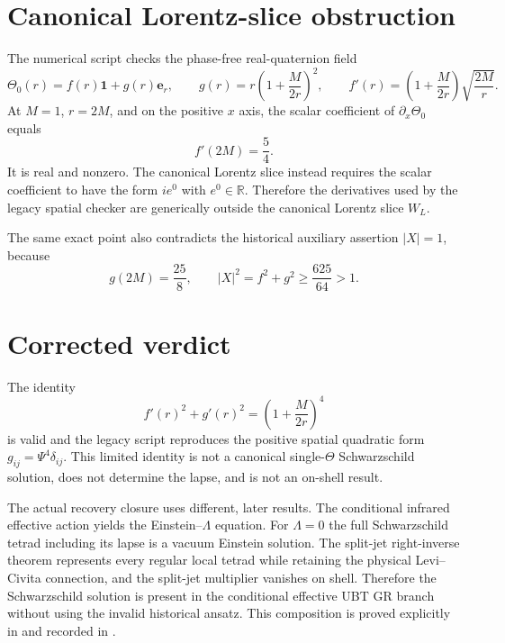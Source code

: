 \documentclass[11pt,a4paper]{article}
\begin{document}
\section{Canonical Lorentz-slice obstruction}
The numerical script checks the phase-free real-quaternion field
\begin{equation}
 \Theta_0(r)=f(r)\mathbf1+g(r)\mathbf e_r,
 \qquad
 g(r)=r\left(1+\frac{M}{2r}\right)^2,
 \qquad
 f'(r)=\left(1+\frac{M}{2r}\right)\sqrt{\frac{2M}{r}}.
 \label{eq:legacy-spatial}
\end{equation}
At $M=1$, $r=2M$, and on the positive $x$ axis, the scalar coefficient of
$\partial_x\Theta_0$ equals
\begin{equation}
 f'(2M)=\frac54.
 \label{eq:slice-witness}
\end{equation}
It is real and nonzero.  The canonical Lorentz slice instead requires the
scalar coefficient to have the form $i e^0$ with $e^0\in\mathbb R$.
Therefore the derivatives used by the legacy spatial checker are generically
outside the canonical Lorentz slice $W_L$.

The same exact point also contradicts the historical auxiliary assertion
$|X|=1$, because
\begin{equation}
 g(2M)=\frac{25}{8},
 \qquad |X|^2=f^2+g^2\geq\frac{625}{64}>1.
 \label{eq:norm-witness}
\end{equation}

\section{Corrected verdict}
The identity
\begin{equation}
 f'(r)^2+g'(r)^2=\left(1+\frac{M}{2r}\right)^4
 \label{eq:spatial-identity}
\end{equation}
is valid and the legacy script reproduces the positive spatial quadratic form
$g_{ij}=\Psi^4\delta_{ij}$.  This limited identity is not a canonical
single-$\Theta$ Schwarzschild solution, does not determine the lapse, and is
not an on-shell result.

The actual recovery closure uses different, later results.  The conditional
infrared effective action yields the Einstein--$\Lambda$ equation.  For
$\Lambda=0$ the full Schwarzschild tetrad including its lapse is a vacuum
Einstein solution.  The split-jet right-inverse theorem represents every
regular local tetrad while retaining the physical Levi--Civita connection, and
the split-jet multiplier vanishes on shell.  Therefore the Schwarzschild
solution is present in the conditional effective UBT GR branch without using
the invalid historical ansatz.  This composition is proved explicitly in
 and recorded in
.
\end{document}
